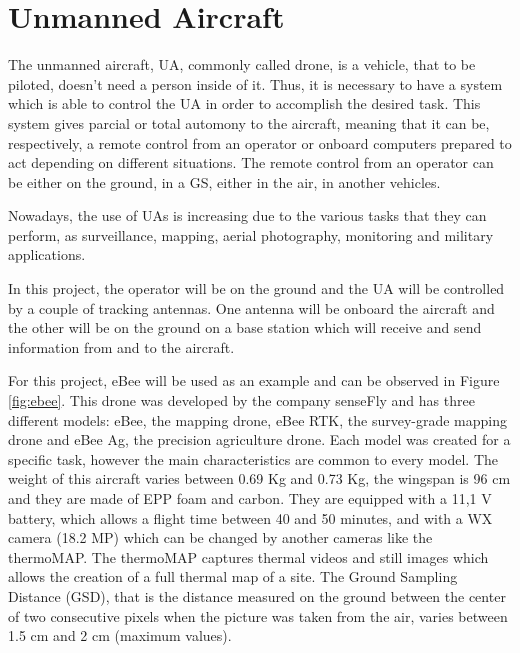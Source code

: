 \section{Unmanned Aircraft}\label{sec:drone}

The unmanned aircraft, UA, commonly called drone, is a vehicle, that to be piloted, doesn't need a person inside of it. Thus, it is necessary to have a system which is able to control the UA in order to accomplish the desired task. This system gives parcial or total automony to the aircraft, meaning that it can be, respectively, a remote control from an operator or onboard computers prepared to act depending on different situations. The remote control from an operator can be either on the ground, in a GS, either in the air, in another vehicles.

Nowadays, the use of UAs is increasing due to the various tasks that they can perform, as surveillance, mapping, aerial photography, monitoring and military applications.

In this project, the operator will be on the ground and the UA will be controlled by a couple of tracking antennas. One antenna will be onboard the aircraft and the other will be on the ground on a base station which will receive and send information from and to the aircraft. 

For this project, eBee will be used as an example and can be observed in Figure \ref{fig:ebee}. This drone was developed by the company senseFly and has three different models: eBee, the mapping drone, eBee RTK, the survey-grade mapping drone and eBee Ag, the precision agriculture drone. Each model was created for a specific task, however the main characteristics are common to every model. The weight of this aircraft varies between 0.69 Kg and 0.73 Kg, the wingspan is 96 cm and they are made of EPP foam and carbon. They are equipped with a 11,1 V battery, which allows a flight time between 40 and 50 minutes, and with a WX camera (18.2 MP) which can be changed by another cameras like the thermoMAP. The thermoMAP captures thermal videos and still images which allows the creation of a full thermal map of a site. The Ground Sampling Distance (GSD), that is the distance measured on the ground between the center of two consecutive pixels when the picture was taken from the air, varies between 1.5 cm and 2 cm (maximum values). 
 

